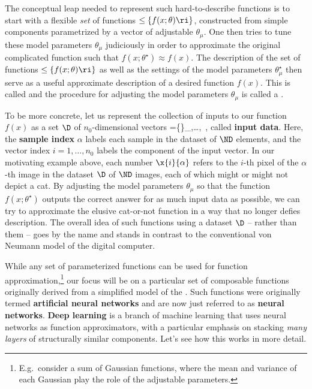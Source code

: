 The conceptual leap needed to represent such hard-to-describe functions is to start with a flexible \emph{set} of functions $\le\{f(x;\theta)\ri\}$, constructed from simple components parametrized by a vector of adjustable  $\theta_{\mu}$. One then tries to tune these model parameters $\theta_{\mu}$ judiciously in order to approximate the original complicated function such that $f(x;\theta^\star) \approx f(x)$. The description of the set of functions $\le\{ f(x;\theta)\ri\}$ as well as the settings of the model parameters $\theta^\star_{\mu}$ then serve as a useful approximate description of a desired function $f(x)$. This is called  and the procedure for adjusting the model parameters $\theta_{\mu}$ is called a .%

To be more concrete, let us represent the collection of 
inputs to our function $f(x)$ as a set $\D$ of $n_0$-dimensional vectors
\be
\D=\le\{\ri\}_{,\ldots,\ND}\, ,
\ee
called \textbf{input data}.
Here, the \textbf{sample index} $\alpha$ labels each sample in the dataset of $\ND$ elements, and the vector index $i=1,\ldots,n_0$ labels the component of the input vector. 
In our motivating example above, each number $\x{i}{\alpha}$ refers to the $i$-th pixel
of the $\alpha$-th  image in the dataset $\D$ of $\ND$ images, each of which might or might not 
depict a cat. By adjusting the model parameters $\theta_{\mu}$ so that the function $f(x;\theta^\star)$ outputs the correct answer for as much input data as possible, we can try to approximate the elusive cat-or-not %
function in a way that no longer defies description. The overall idea of  such functions using a dataset $\D$ -- rather than  them --  goes by the name 
and stands in contrast to the conventional von Neumann model of the digital computer. 


While any set of parameterized functions can be used for function approximation,\footnote{E.g.~consider a sum of  Gaussian functions, where the mean and variance of each Gaussian play the role of the adjustable parameters.} our focus will be on a particular set of composable functions originally derived from a simplified model of the . Such functions were originally termed \textbf{artificial neural networks} and are now just referred to as \textbf{neural networks}. \textbf{Deep learning} is a branch of machine learning that uses neural networks as function approximators, with a particular emphasis on stacking \emph{many layers} of structurally similar components. Let's see how this works in more detail.






